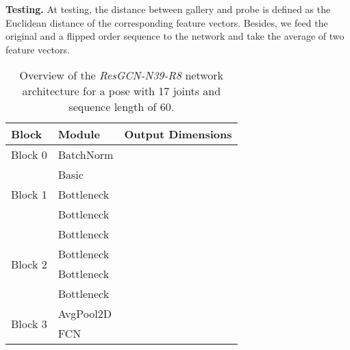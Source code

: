 \documentclass{article}
\newcommand{\nparagraph}[1]{\noindent\textbf{#1.  }}
\begin{document}
\nparagraph{Testing} At testing, the distance between gallery and probe is defined as the Euclidean distance of the corresponding feature vectors. Besides, we feed the original and a flipped order sequence to the network and take the average of two feature vectors.


\begin{table}
 \caption{Overview of the \textit{ResGCN-N39-R8} network architecture for a pose with 17 joints and sequence length of 60.}
 \label{tab:net}

\fontsize{9}{11}\selectfont
 \centering
 \begin{tabularx}{.71\linewidth}{l  l  c }
 \toprule
  Block & Module & Output Dimensions \\
 \midrule 
  Block 0 & BatchNorm &  \\
  \hline
  \multirow{3}{*}{Block 1}
   & Basic & \\
   & Bottleneck &  \\
   & Bottleneck &  \\
  \hline
  \multirow{4}{*}{Block 2}
   & Bottleneck &  \\
   & Bottleneck &  \\
   & Bottleneck &  \\
   & Bottleneck &  \\
   \hline
   \multirow{2}{*}{Block 3} & AvgPool2D &  \\
   & FCN &  \\
 \bottomrule
\end{tabularx}
\end{table}
\end{document}
